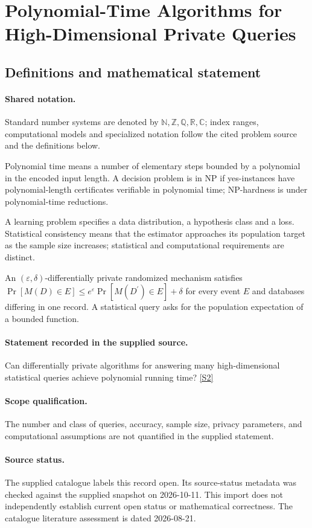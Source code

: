 \documentclass[11pt]{article}
\newcommand{\sref}[2]{\hyperlink{source:#1:#2}{[S#2]}}
\begin{document}
\section{Polynomial-Time Algorithms for High-Dimensional Private Queries}\label{statement}

\subsection{Definitions and mathematical statement}

\paragraph{Shared notation.}Standard number systems are denoted by $\mathbb N,\mathbb Z,\mathbb Q,\mathbb R,\mathbb C$; index ranges, computational models and specialized notation follow the cited problem source and the definitions below.


Polynomial time means a number of elementary steps bounded by a polynomial in the encoded input length. A decision problem is in $\mathrm{NP}$ if yes-instances have polynomial-length certificates verifiable in polynomial time; NP-hardness is under polynomial-time reductions.

A learning problem specifies a data distribution, a hypothesis class and a loss. Statistical consistency means that the estimator approaches its population target as the sample size increases; statistical and computational requirements are distinct.

An $(\varepsilon,\delta)$-differentially private randomized mechanism satisfies $\Pr[M(D)\in E]\leq e^\varepsilon\Pr[M(D^{\prime})\in E]+\delta$ for every event $E$ and databases differing in one record. A statistical query asks for the population expectation of a bounded function.
\paragraph{Statement recorded in the supplied source.}
Can differentially private algorithms for answering many high-dimensional statistical queries achieve polynomial running time? \sref{statement}{2}
\paragraph{Scope qualification.}
The number and class of queries, accuracy, sample size, privacy parameters, and computational assumptions are not quantified in the supplied statement.
\paragraph{Source status.}
The supplied catalogue labels this record open. Its source-status metadata was checked against the supplied snapshot on 2026-10-11. This import does not independently establish current open status or mathematical correctness. The catalogue literature assessment is dated 2026-08-21.
\end{document}

